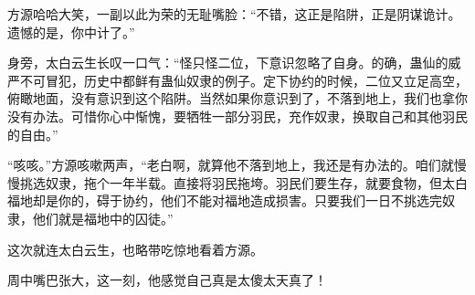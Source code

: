 \begin{this_body}
方源哈哈大笑，一副以此为荣的无耻嘴脸：“不错，这正是陷阱，正是阴谋诡计。遗憾的是，你中计了。”

身旁，太白云生长叹一口气：“怪只怪二位，下意识忽略了自身。的确，蛊仙的威严不可冒犯，历史中都鲜有蛊仙奴隶的例子。定下协约的时候，二位又立足高空，俯瞰地面，没有意识到这个陷阱。当然如果你意识到了，不落到地上，我们也拿你没有办法。可惜你心中惭愧，要牺牲一部分羽民，充作奴隶，换取自己和其他羽民的自由。”

“咳咳。”方源咳嗽两声，“老白啊，就算他不落到地上，我还是有办法的。咱们就慢慢挑选奴隶，拖个一年半载。直接将羽民拖垮。羽民们要生存，就要食物，但太白福地却是你的，碍于协约，他们不能对福地造成损害。只要我们一日不挑选完奴隶，他们就是福地中的囚徒。”

这次就连太白云生，也略带吃惊地看着方源。

周中嘴巴张大，这一刻，他感觉自己真是太傻太天真了！

\end{this_body}

